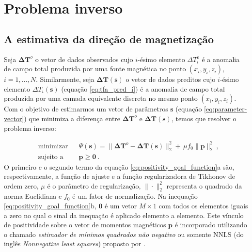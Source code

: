 \section{Problema inverso}

\subsection{A estimativa da direção de magnetização}
\label{subsec:mag_dir_est}

Seja $\mathbf{\Delta T}^{o}$ o vetor de dados observados cujo $i$-ésimo elemento $\Delta T_{i}^{o}$ é a anomalia de campo total produzida por uma fonte magnética no ponto $(x_{i},y_{i},z_{i})$, $i = 1, \dots, N$. Similarmente, seja $\mathbf{\Delta T} (\mathbf{s})$ o vetor de dados preditos cujo $i$-ésimo elemento $\Delta T_{i}(\mathbf{s})$ (equação \ref{eq:tfa_pred_i}) é a anomalia de campo total produzida por uma camada equivalente discreta no mesmo ponto $(x_{i},y_{i},z_{i})$. Com o objetivo de estimarmos um vetor de parâmetros $\mathbf{s}$ (equação \ref{eq:parameter-vector}) que minimiza a diferença entre $\mathbf{\Delta T}^{o}$ e $\mathbf{\Delta T}(\mathbf{s})$, temos que resolver o problema inverso:

\begin{subequations}
	\begin{align}
	& \text{minimizar}
	& &\Psi(\mathbf{s}) =\lVert \mathbf{\Delta T}^{o} - \mathbf{\Delta T} (\mathbf{s}) 
	\rVert_{2}^{2} + \, \mu f_0 \parallel \mathbf{p} \parallel_{2}^{2} \: , \\
	& \text{sujeito a}
	& & \mathbf{p} \geqslant \mathbf{0} \: .
	\end{align}
	\label{eq:positivity_goal_function}
\end{subequations}
O primeiro e o segundo termo da equação \ref{eq:positivity_goal_function}a são, respectivamente, a função de ajuste e a função regularizadora de Tikhonov de ordem zero, $\mu$ é o parâmetro de regularização, $\| \cdot \|_{2}^{2}$ representa o quadrado da norma Euclidiana e $f_{0}$ é um fator de normalização. Na inequação \ref{eq:positivity_goal_function}b, $\mathbf{0}$ é um vetor $M \times 1$ com todos os elementos iguais a zero no qual o sinal da inequação é aplicado elemento a elemento. Este vínculo de positividade sobre o vetor de momentos magnéticos $\mathbf{p}$ é incorporado utilizando o chamado \textit{estimador de mínimos quadrados não negativo} ou somente NNLS (do inglês \textit{Nonnegative least squares}) proposto por \cite{lawson_hanson_1974}.

